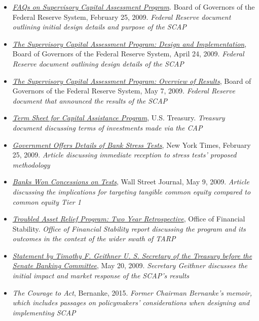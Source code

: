 \documentclass[justified, nobib]{tufte-handout2}
\begin{document}
\begin{itemize}
\item
  \href{http://www.federalreserve.gov/newsevents/press/bcreg/bcreg20090225a1.pdf}{\emph{FAQs
  on Supervisory Capital Assessment Program}}. Board of Governors of the
  Federal Reserve System, February 25, 2009. \emph{Federal Reserve
  document outlining initial design details and purpose of the SCAP}
\item
  \href{http://www.federalreserve.gov/bankinforeg/bcreg20090424a1.pdf}{\emph{The
  Supervisory Capital Assessment Program: Design and Implementation}},
  Board of Governors of the Federal Reserve System, April 24, 2009.
  \emph{Federal Reserve document outlining design details of the SCAP}
\item
  \href{http://www.federalreserve.gov/newsevents/press/bcreg/bcreg20090507a1.pdfhttp:/www.federalreserve.gov/newsevents/press/bcreg/bcreg20090507a1.pdf?bcsi_scan_D92198957E035F0B=0\&bcsi_scan_filename=bcreg20090507a1.pdf}{\emph{The
  Supervisory Capital Assessment Program: Overview of Results}}, Board
  of Governors of the Federal Reserve System, May 7, 2009. \emph{Federal
  Reserve document that announced the results of the SCAP}
\item
  \href{http://www.treasury.gov/press-center/press-releases/Documents/tg40_captermsheet.pdf}{\emph{Term
  Sheet for Capital Assistance Program}}, U.S. Treasury. \emph{Treasury
  document discussing terms of investments made via the CAP}
\item
  \href{http://www.nytimes.com/2009/02/26/business/economy/26banks.html}{\emph{Government
  Offers Details of Bank Stress Tests}}, New York Times, February 25,
  2009. \emph{Article discussing immediate reception to stress tests'
  proposed methodology}
\item
  \href{http://www.wsj.com/articles/SB124182311010302297}{\emph{Banks
  Won Concessions on Tests}}, Wall Street Journal, May 9, 2009.
  \emph{Article discussing the implications for targeting tangible
  common equity compared to common equity Tier 1}
\item
  \href{http://www.treasury.gov/press-center/news/Documents/TARP\%20Two\%20Year\%20Retrospective_10\%2005\%2010_transmittal\%20letter.pdf}{\emph{Troubled
  Asset Relief Program: Two Year Retrospective}}, Office of Financial
  Stability. \emph{Office of Financial Stability report discussing the
  program and its outcomes in the context of the wider swath of TARP}
\item
  \href{https://www.treasury.gov/press-center/press-releases/Pages/tg139.aspx.}{\emph{Statement
  by Timothy F. Geithner U. S. Secretary of the Treasury before the
  Senate Banking Committee}}, May 20, 2009. \emph{Secretary Geithner
  discusses the initial impact and market response of the SCAP's
  results}
\item
  \emph{The Courage to Act}, Bernanke, 2015. \emph{Former Chairman
  Bernanke's memoir, which includes passages on policymakers'
  considerations when designing and implementing SCAP}
\end{itemize}
\end{document}

